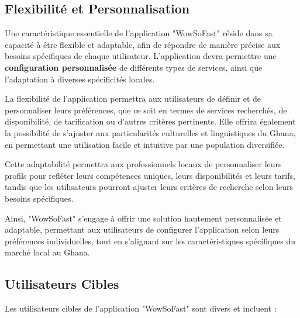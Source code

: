 \subsection{Flexibilité et Personnalisation}

Une caractéristique essentielle de l'application "WowSoFast" réside dans sa capacité à être flexible et adaptable, afin de répondre de manière précise aux besoins spécifiques de chaque utilisateur. L'application devra permettre une \textbf{configuration personnalisée} de différents types de services, ainsi que l'adaptation à diverses spécificités locales.

\vspace{0.5cm}

La flexibilité de l'application permettra aux utilisateurs de définir et de personnaliser leurs préférences, que ce soit en termes de services recherchés, de disponibilité, de tarification ou d'autres critères pertinents. Elle offrira également la possibilité de s'ajuster aux particularités culturelles et linguistiques du Ghana, en permettant une utilisation facile et intuitive par une population diversifiée.

\vspace{0.5cm}

Cette adaptabilité permettra aux professionnels locaux de personnaliser leurs profils pour refléter leurs compétences uniques, leurs disponibilités et leurs tarifs, tandis que les utilisateurs pourront ajuster leurs critères de recherche selon leurs besoins spécifiques.

\vspace{0.5cm}

Ainsi, "WowSoFast" s'engage à offrir une solution hautement personnalisée et adaptable, permettant aux utilisateurs de configurer l'application selon leurs préférences individuelles, tout en s'alignant sur les caractéristiques spécifiques du marché local au Ghana.

\subsection{Utilisateurs Cibles}

Les utilisateurs cibles de l'application "WowSoFast" sont divers et incluent :

